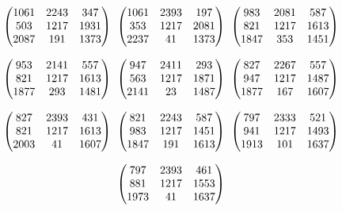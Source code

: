 $$
\begin{array}{c@{\vspace{0.2cm}}@{\hspace{0.2cm}}c@{\vspace{0.2cm}}@{\hspace{0.2cm}}c}
\begin{pmatrix}1061 & 2243 & 347 \\ 503 & 1217 & 1931 \\ 2087 & 191 & 1373\end{pmatrix} &
\begin{pmatrix}1061 & 2393 & 197 \\ 353 & 1217 & 2081 \\ 2237 & 41 & 1373\end{pmatrix} &
\begin{pmatrix}983 & 2081 & 587 \\ 821 & 1217 & 1613 \\ 1847 & 353 & 1451\end{pmatrix} \\
\begin{pmatrix}953 & 2141 & 557 \\ 821 & 1217 & 1613 \\ 1877 & 293 & 1481\end{pmatrix} &
\begin{pmatrix}947 & 2411 & 293 \\ 563 & 1217 & 1871 \\ 2141 & 23 & 1487\end{pmatrix} &
\begin{pmatrix}827 & 2267 & 557 \\ 947 & 1217 & 1487 \\ 1877 & 167 & 1607\end{pmatrix} \\
\begin{pmatrix}827 & 2393 & 431 \\ 821 & 1217 & 1613 \\ 2003 & 41 & 1607\end{pmatrix} &
\begin{pmatrix}821 & 2243 & 587 \\ 983 & 1217 & 1451 \\ 1847 & 191 & 1613\end{pmatrix} &
\begin{pmatrix}797 & 2333 & 521 \\ 941 & 1217 & 1493 \\ 1913 & 101 & 1637\end{pmatrix} \\
 & 
\begin{pmatrix}797 & 2393 & 461 \\ 881 & 1217 & 1553 \\ 1973 & 41 & 1637 \end{pmatrix} &
\end{array}
$$

